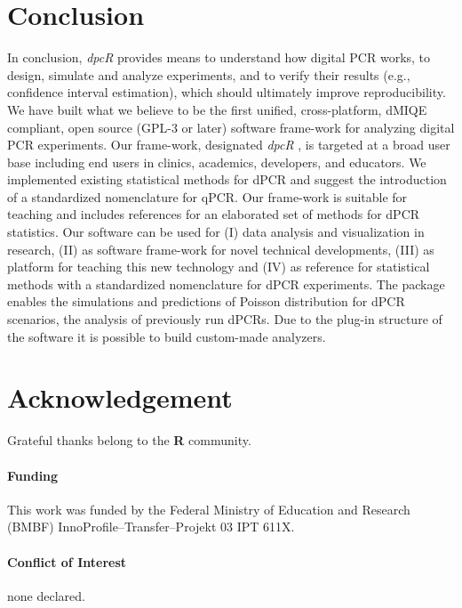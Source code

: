 \documentclass{bioinfo}
\begin{document}
%
%






\section{Conclusion}

In conclusion, \textit{dpcR} provides means to understand how digital PCR works, 
to design, simulate and analyze experiments, and to verify their results (e.g., 
confidence interval estimation), which should ultimately improve 
reproducibility. We have built what we believe to be the first unified, 
cross-platform, dMIQE compliant, open source (GPL-3 or later) software frame-work for 
analyzing digital PCR experiments. Our frame-work, designated \textit{dpcR} , is 
targeted at a broad user base including end users in clinics, academics, 
developers, and educators. We implemented existing statistical methods for dPCR 
and suggest the introduction of a standardized nomenclature for qPCR. Our 
frame-work is suitable for teaching and includes references for an elaborated 
set of methods for dPCR statistics. Our software can be used for (I) data 
analysis and visualization in research, (II) as software frame-work for novel 
technical developments, (III) as platform for teaching this new technology and 
(IV) as reference for statistical methods with a standardized nomenclature for 
dPCR experiments. The package enables the simulations and predictions of Poisson 
distribution for dPCR scenarios, the analysis of previously run dPCRs. Due to 
the plug-in structure of the software it is possible to build custom-made 
analyzers.

\section*{Acknowledgement}

Grateful thanks belong to the \textbf{R} community.

\paragraph{Funding\textcolon} This work was funded by the Federal Ministry of Education and Research (BMBF)
 InnoProfile--Transfer--Projekt 03 IPT 611X.

\paragraph{Conflict of Interest\textcolon} none declared.

%
%
%
%
%
%

%

\end{document}
